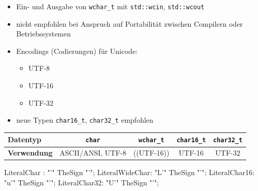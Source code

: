 \documentclass[a4paper]{report}
\begin{document}
\begin{itemize}
\begin{itemize}
		\item  Ein- und Ausgabe von \texttt{wchar\_t} mit \texttt{std::wcin}, \texttt{std::wcout}
		\item nicht empfohlen bei Anspruch auf Portabilität zwischen Compilern oder Betriebssystemen
		\bigskip
		\item Encodings (Codierungen) für Unicode:
		\begin{itemize}
			\item UTF-8
			\item UTF-16
			\item UTF-32
		\end{itemize}
		\item neue Typen \texttt{char16\_t}, \texttt{char32\_t} empfohlen
	\end{itemize}
		
\end{itemize}
\begin{center}
\begin{tabular}{|p{4cm}|c|c|c|c|} \hline
	\textbf{Datentyp} & \texttt{char} & \texttt{wchar\_t} & \texttt{char16\_t} & \texttt{char32\_t} \\ \hline
	\textbf{Verwendung}  & ASCII/ANSI, UTF-8 & ((UTF-16)) & UTF-16 & UTF-32 \\ \hline
\end{tabular}
\end{center}

\begin{rail}
	LiteralChar : "'" TheSign "'";
	LiteralWideChar: "L'" TheSign "'";
	LiteralChar16: "u'" TheSign "'";
	LiteralChar32: "U'" TheSign "'";
\end{rail}

\end{document}
